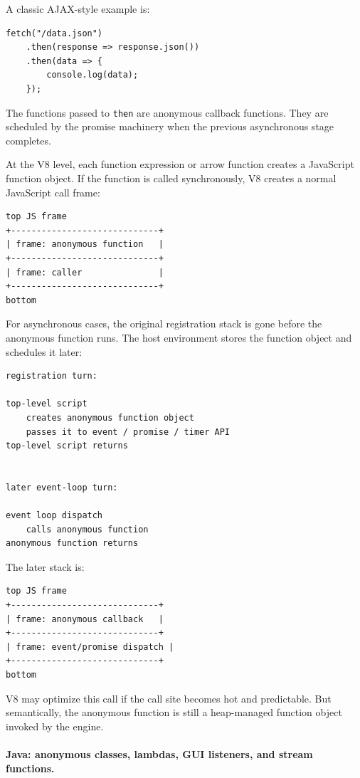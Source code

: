 A classic AJAX-style example is:

\begin{verbatim}
fetch("/data.json")
    .then(response => response.json())
    .then(data => {
        console.log(data);
    });
\end{verbatim}

The functions passed to \texttt{then} are anonymous callback functions. They are scheduled by the promise machinery when the previous asynchronous stage completes.

At the V8 level, each function expression or arrow function creates a JavaScript function object. If the function is called synchronously, V8 creates a normal JavaScript call frame:

\begin{verbatim}
top JS frame
+-----------------------------+
| frame: anonymous function   |
+-----------------------------+
| frame: caller               |
+-----------------------------+
bottom
\end{verbatim}

For asynchronous cases, the original registration stack is gone before the anonymous function runs. The host environment stores the function object and schedules it later:

\begin{verbatim}
registration turn:

top-level script
    creates anonymous function object
    passes it to event / promise / timer API
top-level script returns


later event-loop turn:

event loop dispatch
    calls anonymous function
anonymous function returns
\end{verbatim}

The later stack is:

\begin{verbatim}
top JS frame
+-----------------------------+
| frame: anonymous callback   |
+-----------------------------+
| frame: event/promise dispatch |
+-----------------------------+
bottom
\end{verbatim}

V8 may optimize this call if the call site becomes hot and predictable. But semantically, the anonymous function is still a heap-managed function object invoked by the engine.

\paragraph{Java: anonymous classes, lambdas, GUI listeners, and stream functions.}

